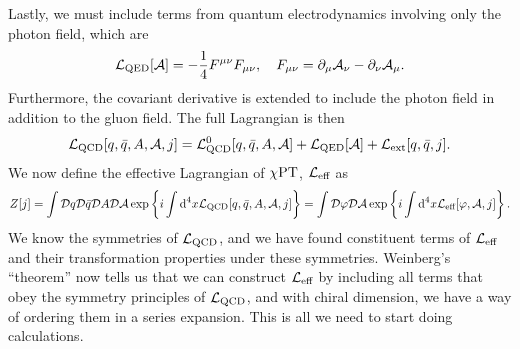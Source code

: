 Lastly, we must include terms from quantum electrodynamics involving only the photon field, which are
%
\begin{equation}
    \mathcal{L}_\text{QED}[\mathcal A] 
    = -\frac{1}{4} F^{\mu \nu}F_{\mu \nu}, \quad
    F_{\mu \nu} = \partial_{\mu}\mathcal A_{\nu} - \partial_{\nu}\mathcal A_{\mu}.
\end{equation}
%
Furthermore, the covariant derivative is extended to include the photon field in addition to the gluon field.
The full Lagrangian is then
%
\begin{equation}
    \mathcal{L}_\text{QCD}[q, \bar q, A,\mathcal A, j] 
    = \mathcal{L}_\text{QCD}^0[q, \bar q, A, \mathcal A] 
    + \mathcal{L}_\text{QED}[\mathcal A] + \mathcal{L}_\text{ext}[q, \bar q, j].
\end{equation}
%
We now define the effective Lagrangian of $\chi \text{PT}$, $\mathcal{L}_\text{eff}$ as
%
\begin{equation}
    \label{definition effective Lagrangian chpt}
    Z[j]
    = 
    \int \mathcal D q \mathcal D \bar q \mathcal D A \mathcal D \mathcal A\,
    \text{exp} \left\{ i\int \text{d}^4 x \mathcal{L}_\text{QCD}[q, \bar q, A, \mathcal A, j]  \right\}
    = 
    \int \mathcal D \varphi \mathcal D \mathcal A\,
    \text{exp} \left\{ i\int \text{d}^4 x \mathcal{L}_\text{eff}[\varphi, \mathcal{A}, j]  \right\}.
\end{equation}
%
We know the symmetries of $\mathcal{L}_\text{QCD}$, and we have found constituent terms of $\mathcal{L}_\text{eff}$ and their transformation properties under these symmetries.
Weinberg's ``theorem'' now tells us that we can construct $\mathcal{L}_\text{eff}$ by including all terms that obey the symmetry principles of $\mathcal{L}_\text{QCD}$, and with chiral dimension, we have a way of ordering them in a series expansion.
This is all we need to start doing calculations.

